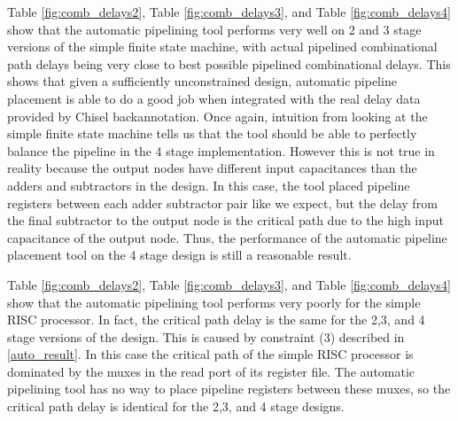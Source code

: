 Table \ref{fig:comb_delays2}, Table \ref{fig:comb_delays3}, and Table \ref{fig:comb_delays4} show that the automatic pipelining tool performs very well on 2 and 3 stage versions of the simple finite state machine, with actual pipelined combinational path delays being very close to best possible pipelined combinational delays. This shows that given a sufficiently unconstrained design, automatic pipeline placement is able to do a good job when integrated with the real delay data provided by Chisel backannotation. Once again, intuition from looking at the simple finite state machine tells us that the tool should be able to perfectly balance the pipeline in the 4 stage implementation. However this is not true in reality because the output nodes have different input capacitances than the adders and subtractors in the design. In this case, the tool placed pipeline registers between each adder subtractor pair like we expect, but the delay from the final subtractor to the output node is the critical path due to the high input capacitance of the output node. Thus, the performance of the automatic pipeline placement tool on the 4 stage design is still a reasonable result.

Table \ref{fig:comb_delays2}, Table \ref{fig:comb_delays3}, and Table \ref{fig:comb_delays4} show that the automatic pipelining tool performs very poorly for the simple RISC processor. In fact, the critical path delay is the same for the 2,3, and 4 stage versions of the design. This is caused by constraint (3) described in \ref{auto_result}. In this case the critical path of the simple RISC processor is dominated by the muxes in the read port of its register file. The automatic pipelining tool has no way to place pipeline registers between these muxes, so the critical path delay is identical for the 2,3, and 4 stage designs.

